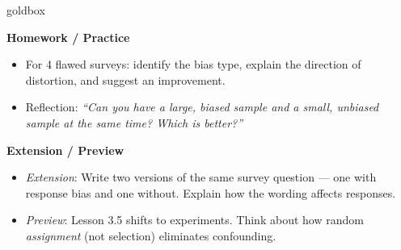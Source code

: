 \documentclass[10pt]{article}
\begin{document}
\begin{skillbox}{goldbox}
\begin{minipage}[t]{0.48\linewidth}
    \textbf{Homework / Practice}
    \begin{itemize}
        \item For 4 flawed surveys: identify the bias type, explain the direction of
              distortion, and suggest an improvement.
        \item Reflection: \textit{``Can you have a large, biased sample and a small,
              unbiased sample at the same time? Which is better?''}
    \end{itemize}
\end{minipage}
\hfill
\begin{minipage}[t]{0.48\linewidth}
    \textbf{Extension / Preview}
    \begin{itemize}
        \item \textit{Extension}: Write two versions of the same survey question ---
              one with response bias and one without. Explain how the wording
              affects responses.
        \item \textit{Preview}: Lesson 3.5 shifts to experiments. Think about how
              random \emph{assignment} (not selection) eliminates confounding.
    \end{itemize}
\end{minipage}
\end{skillbox}
\end{document}
